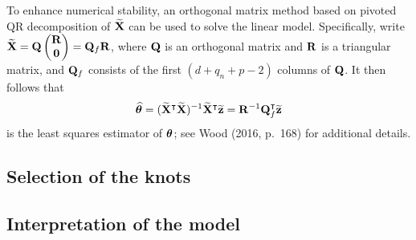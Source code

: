 To enhance numerical stability, an orthogonal matrix method based on pivoted QR decomposition of $\widetilde{\mathbf{X}}$ can be used to solve the linear model. Specifically, write $\widetilde{\mathbf{X}} = \mathbf{Q}\left(\begin{matrix} \mathbf{R} \\ \mathbf{0} \end{matrix}\right) = \mathbf{Q}_f\mathbf{R}$, where $\mathbf{Q}$ is an orthogonal matrix and $\mathbf{R}$ is a triangular matrix, and $\mathbf{Q}_f$ consists of the first $(d + q_n + p - 2)$ columns of $\mathbf{Q}$. It then follows that
\[
\widehat{\bm\theta} = (\widetilde{\mathbf{X}}^\intercal\widetilde{\mathbf{X}})^{-1}\widetilde{\mathbf{X}}^\intercal\widetilde{\mathbf{z}} = \mathbf{R}^{-1}\mathbf{Q}_f^\intercal\widetilde{\mathbf{z}}
\]
is the least squares estimator of $\bm\theta$; see Wood (2016, p.\ 168) for additional details. %




\subsection{\y Selection of the knots}\label{selection}

\subsection{\y Interpretation of the model}
